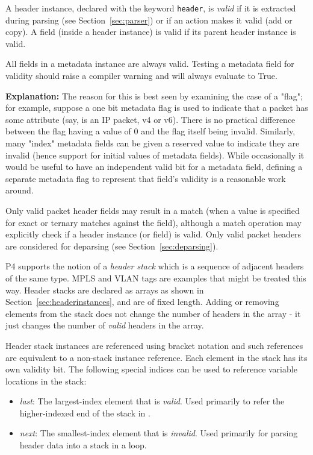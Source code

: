 \documentclass[12pt]{article}
\begin{document}
A header instance, declared with the keyword \texttt{header}, is \textit{valid}
if it is extracted during parsing (see Section~\ref{sec:parser}) or if an action
makes it valid (add or copy). A field (inside a header instance) is valid if its
parent header instance is valid.

All fields in a metadata instance are always valid.  Testing a
metadata field for validity should raise a compiler warning and will
always evaluate to True.

\begin{adjustwidth}{1.5cm}{1.5cm}
\textbf{Explanation: } The reason for this is best seen by examining
the case of a "flag"; for example, suppose a one bit metadata flag is
used to indicate that a packet has some attribute (say, is an IP
packet, v4 or v6).  There is no practical difference between the flag
having a value of 0 and the flag itself being invalid.  Similarly,
many "index" metadata fields can be given a reserved value to indicate
they are invalid (hence support for initial values of metadata
fields).  While occasionally it would be useful to have an independent
valid bit for a metadata field, defining a separate metadata flag to
represent that field's validity is a reasonable work around.
\end{adjustwidth}

Only valid packet header fields may result in a match (when a value is
specified for exact or ternary matches against the field), although a
match operation may explicitly check if a header instance (or field)
is valid. Only valid packet headers are considered for deparsing (see
Section~\ref{sec:deparsing}).  


P4 supports the notion of a \textit{header stack} which is a sequence of
adjacent headers of the same type. MPLS and VLAN tags are examples that might
be treated this way.  Header stacks are declared as arrays as shown in
Section~\ref{sec:headerinstances}, and are of fixed length. Adding or removing
elements from the stack does not change the number of headers in the array - it
just changes the number of \textit{valid} headers in the array.

Header stack instances are referenced using bracket notation and such
references are equivalent to a non-stack instance reference. Each
element in the stack has its own validity bit. The following special
indices can be used to reference variable locations in the stack:

\begin{itemize}
\item
\textit{last}: The largest-index element that is \textit{valid}.
Used primarily to refer the higher-indexed end of the stack in \matchaction.
\item
\textit{next}: The smallest-index element that is \textit{invalid}.
Used primarily for parsing header data into a stack in a loop.
\end{itemize}
\end{document}
